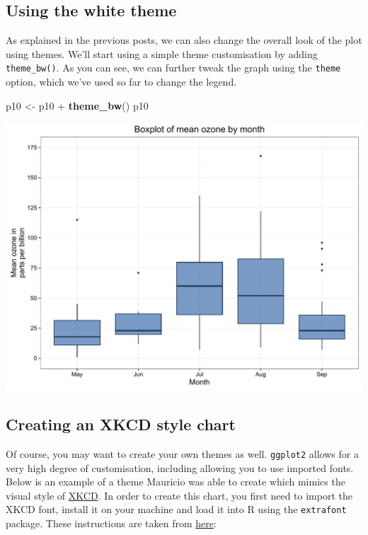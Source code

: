 \documentclass[]{article}
\newenvironment{Shaded}{\begin{snugshade}}{\end{snugshade}}
\newcommand{\KeywordTok}[1]{\textcolor[rgb]{0.13,0.29,0.53}{\textbf{{#1}}}}
\newcommand{\StringTok}[1]{\textcolor[rgb]{0.31,0.60,0.02}{{#1}}}
\newcommand{\NormalTok}[1]{{#1}}
\begin{document}
\subsection{Using the white theme}\label{using-the-white-theme-9}

As explained in the previous posts, we can also change the overall look
of the plot using themes. We'll start using a simple theme customisation
by adding \texttt{theme\_bw()}. As you can see, we can further tweak the
graph using the \texttt{theme} option, which we've used so far to change
the legend.

\begin{Shaded}
\begin{Highlighting}[]
\NormalTok{p10 <-}\StringTok{ }\NormalTok{p10 +}\StringTok{ }\KeywordTok{theme_bw}\NormalTok{()}
\NormalTok{p10}
\end{Highlighting}
\end{Shaded}

\begin{center}\includegraphics{0_all_posts_pdf/box_10-1} \end{center}

\subsection{Creating an XKCD style
chart}\label{creating-an-xkcd-style-chart-9}

Of course, you may want to create your own themes as well.
\texttt{ggplot2} allows for a very high degree of customisation,
including allowing you to use imported fonts. Below is an example of a
theme Mauricio was able to create which mimics the visual style of
\href{http://xkcd.com/}{XKCD}. In order to create this chart, you first
need to import the XKCD font, install it on your machine and load it
into R using the \texttt{extrafont} package. These instructions are
taken from
\href{https://www.google.com.au/url?sa=t\&rct=j\&q=\&esrc=s\&source=web\&cd=1\&ved=0ahUKEwiWzafchdPJAhVBpJQKHe_LDT8QFggbMAA\&url=https\%3A\%2F\%2Fcran.r-project.org\%2Fweb\%2Fpackages\%2Fxkcd\%2Fvignettes\%2Fxkcd-intro.pdf\&usg=AFQjCNE-KciGY14e-Q1buYIVmTFC0ht__Q\&sig2=DZUwkvIHwfNWtTtkcz94jg}{here}:
\end{document}
